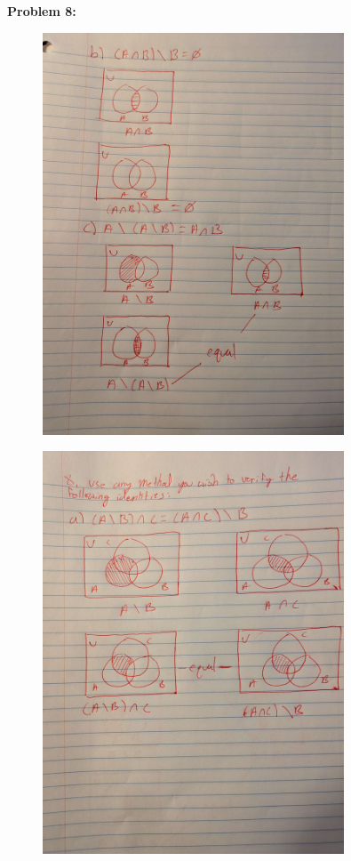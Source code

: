 \textbf{Problem 8:}
\begin{figure}[H]
    \centering
    \includegraphics[width=0.8\textwidth]{images/1.2/6.jpg}
\end{figure}
\begin{figure}[H]
    \centering
    \includegraphics[width=0.8\textwidth]{images/1.2/7.jpg}
\end{figure}

